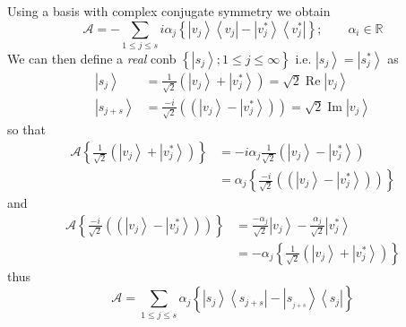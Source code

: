 \documentclass[aps,preprint]{revtex4}%
\begin{document}
Using a basis with complex conjugate symmetry we obtain
\begin{equation}
\mathcal{A=-}\sum_{1\leq j\leq s}i\alpha_{j}\left\{  \left\vert v_{j}%
\right\rangle \left\langle v_{j}\right\vert -\left\vert v_{j}^{\ast
}\right\rangle \left\langle v_{j}^{\ast}\right\vert \right\}  ;\qquad
\alpha_{i}\in\mathbb{R}%
\end{equation}
We can then define a \emph{real} conb $\left\{  \left\vert s_{j}\right\rangle
;1\leq j\leq\infty\right\}  $ i.e. $\left\vert s_{j}\right\rangle =\left\vert
s_{j}^{\ast}\right\rangle $ as
\begin{align}
\left\vert s_{j}\right\rangle  & =\frac{1}{\sqrt{2}}\left(  \left\vert
v_{j}\right\rangle +\left\vert v_{j}^{\ast}\right\rangle \right)  =\sqrt
{2}\operatorname{Re}\left\vert v_{j}\right\rangle \nonumber\\
\left\vert s_{j+s}\right\rangle  & =\frac{-i}{\sqrt{2}}\left(  \left(
\left\vert v_{j}\right\rangle -\left\vert v_{j}^{\ast}\right\rangle \right)
\right)  =\sqrt{2}\operatorname{Im}\left\vert v_{j}\right\rangle
\end{align}
so that
\begin{align}
\mathcal{A}\left\{  \frac{1}{\sqrt{2}}\left(  \left\vert v_{j}\right\rangle
+\left\vert v_{j}^{\ast}\right\rangle \right)  \right\}   & =-i\alpha_{j}%
\frac{1}{\sqrt{2}}\left(  \left\vert v_{j}\right\rangle -\left\vert
v_{j}^{\ast}\right\rangle \right) \nonumber\\
& =\alpha_{j}\left\{  \frac{-i}{\sqrt{2}}\left(  \left(  \left\vert
v_{j}\right\rangle -\left\vert v_{j}^{\ast}\right\rangle \right)  \right)
\right\}
\end{align}
and
\begin{align}
\mathcal{A}\left\{  \frac{-i}{\sqrt{2}}\left(  \left(  \left\vert
v_{j}\right\rangle -\left\vert v_{j}^{\ast}\right\rangle \right)  \right)
\right\}   & =\frac{-\alpha_{j}}{\sqrt{2}}\left\vert v_{j}\right\rangle
-\frac{\alpha_{j}}{\sqrt{2}}\left\vert v_{j}^{\ast}\right\rangle \nonumber\\
& =-\alpha_{j}\left\{  \frac{1}{\sqrt{2}}\left(  \left\vert v_{j}\right\rangle
+\left\vert v_{j}^{\ast}\right\rangle \right)  \right\}
\end{align}
thus
\begin{equation}
\mathcal{A=}\sum_{1\leq j\leq s}\alpha_{j}\left\{  \left\vert s_{j}%
\right\rangle \left\langle s_{j+s}\right\vert -\left\vert s_{_{j+s}%
}\right\rangle \left\langle s_{j}\right\vert \right\}
\end{equation}
\end{document}
